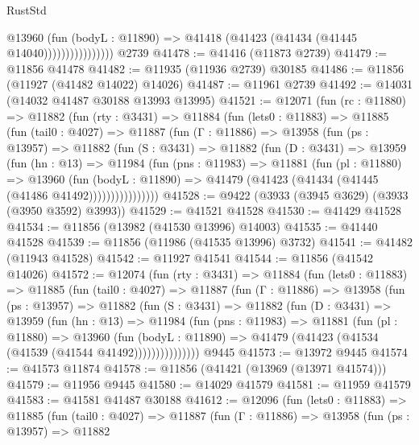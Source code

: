 \begin{lexlean}{RustStd}
\begin{coremodule}
                          @13960
                            (fun (bodyL : @11890) =>
                            @41418 (@41423 (@41434 (@41445 @14040))))))))))))))))
    @2739
@41478 := @41416 (@11873 @2739)
@41479 := @11856 @41478
@41482 := @11935 (@11936 @2739) @30185
@41486 := @11856 (@11927 (@41482 @14022) @14026)
@41487 := @11961 @2739
@41492 := @14031 (@14032 @41487 @30188 @13993 @13995)
@41521 := @12071
    (fun (rc : @11880) =>
    @11882
      (fun (rty : @3431) =>
      @11884
        (fun (lets0 : @11883) =>
        @11885
          (fun (tail0 : @4027) =>
          @11887
            (fun (Γ : @11886) =>
            @13958
              (fun (ps : @13957) =>
              @11882
                (fun (S : @3431) =>
                @11882
                  (fun (D : @3431) =>
                  @13959
                    (fun (hn : @13) =>
                    @11984
                      (fun (pns : @11983) =>
                      @11881
                        (fun (pl : @11880) =>
                        @13960
                          (fun (bodyL : @11890) =>
                          @41479 (@41423 (@41434 (@41445 (@41486 @41492))))))))))))))))
@41528 := @9422 (@3933 (@3945 @3629) (@3933 (@3950 @3592) @3993))
@41529 := @41521 @41528
@41530 := @41429 @41528
@41534 := @11856 (@13982 (@41530 @13996) @14003)
@41535 := @41440 @41528
@41539 := @11856 (@11986 (@41535 @13996) @3732)
@41541 := @41482 (@11943 @41528)
@41542 := @11927 @41541
@41544 := @11856 (@41542 @14026)
@41572 := @12074
    (fun (rty : @3431) =>
    @11884
      (fun (lets0 : @11883) =>
      @11885
        (fun (tail0 : @4027) =>
        @11887
          (fun (Γ : @11886) =>
          @13958
            (fun (ps : @13957) =>
            @11882
              (fun (S : @3431) =>
              @11882
                (fun (D : @3431) =>
                @13959
                  (fun (hn : @13) =>
                  @11984
                    (fun (pns : @11983) =>
                    @11881
                      (fun (pl : @11880) =>
                      @13960
                        (fun (bodyL : @11890) =>
                        @41479 (@41423 (@41534 (@41539 (@41544 @41492)))))))))))))))
    @9445
@41573 := @13972 @9445
@41574 := @41573 @11874
@41578 := @11856 (@41421 (@13969 (@13971 @41574)))
@41579 := @11956 @9445
@41580 := @14029 @41579
@41581 := @11959 @41579
@41583 := @41581 @41487 @30188
@41612 := @12096
    (fun (lets0 : @11883) =>
    @11885
      (fun (tail0 : @4027) =>
      @11887
        (fun (Γ : @11886) =>
        @13958
          (fun (ps : @13957) =>
          @11882

\end{coremodule}
\end{lexlean}
